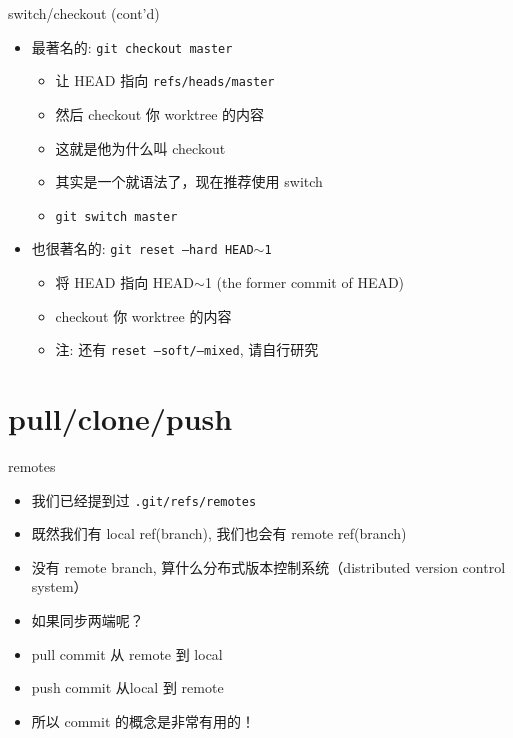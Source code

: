 \documentclass[aspectratio=169]{beamer}
\newcommand{\T}[1]{\texttt{#1}}
\begin{document}
\begin{frame}{switch/checkout (cont'd)}
  \begin{itemize}
    \item<1-> 最著名的: \T{git checkout master}\begin{itemize}
      \item 让 HEAD 指向 \T{refs/heads/master}
	  \item 然后 checkout 你 worktree 的内容
      \item 这就是他为什么叫 checkout
      \item 其实是一个就语法了，现在推荐使用 switch
      \item \T{git switch master}
    \end{itemize}
    \item<2-> 也很著名的: \T{git reset --hard HEAD$\sim$1}\begin{itemize}
      \item 将 HEAD 指向 HEAD$\sim$1 (the former commit of HEAD)
	  \item checkout 你 worktree 的内容
      \item 注: 还有 \T{reset --soft/--mixed}, 请自行研究
    \end{itemize}
  \end{itemize}
\end{frame}

\section{pull/clone/push}
\begin{frame}{remotes}
  \begin{itemize}
    \item 我们已经提到过 \T{.git/refs/remotes}
    \item 既然我们有 local ref(branch), 我们也会有 remote ref(branch)
    \item 没有 remote branch, 算什么分布式版本控制系统（distributed version control system）
    \item 如果同步两端呢？
    \item pull commit 从 remote 到 local
    \item push commit 从local 到 remote
    \item 所以 commit 的概念是非常有用的！
  \end{itemize}
\end{frame}
\end{document}
